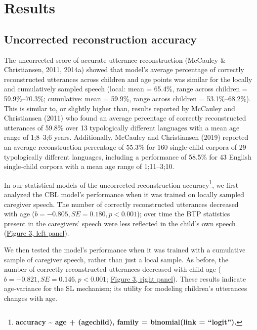 \documentclass[man,mask,floatsintext]{apa6}
\let\rmarkdownfootnote\footnote%
\def\footnote{\protect\rmarkdownfootnote}
\begin{document}
\section{Results}\label{results}

\subsection{Uncorrected reconstruction
accuracy}\label{uncorrected-reconstruction-accuracy}

The uncorrected score of accurate utterance reconstruction (McCauley \&
Christiansen, 2011, 2014a) showed that model's average percentage of
correctly reconstructed utterances across children and age points was
similar for the locally and cumulatively sampled speech (local: mean =
65.4\%, range across children = 59.9\%--70.3\%; cumulative: mean =
59.9\%, range across children = 53.1\%--68.2\%). This is similar to, or
slightly higher than, results reported by McCauley and Christiansen
(2011) who found an average percentage of correctly reconstructed
utterances of 59.8\% over 13 typologically different languages with a
mean age range of 1;8--3;6 years. Additionally, McCauley and
Christiansen (2019) reported an average reconstruction percentage of
55.3\% for 160 single-child corpora of 29 typologically different
languages, including a performance of 58.5\% for 43 English single-child
corpora with a mean age range of 1;11--3;10.

In our statistical models of the uncorrected reconstruction
accuracy\footnote{\textbf{accuracy \textasciitilde{} age +
  (age\textbar{}child), family = binomial(link = \enquote{logit}).}}, we
first analyzed the CBL model's performance when it was trained on
locally sampled caregiver speech. The number of correctly reconstructed
utterances decreased with age (\(b = -0.805, SE = 0.180, p < 0.001\));
over time the BTP statistics present in the caregivers' speech were less
reflected in the child's own speech (\protect\hyperlink{fig3}{Figure 3,
left panel}).

We then tested the model's performance when it was trained with a
cumulative sample of caregiver speech, rather than just a local sample.
As before, the number of correctly reconstructed utterances decreased
with child age (\(b=-0.821, SE = 0.146, p < 0.001\);
\protect\hyperlink{fig3}{Figure 3, right panel}). These results indicate
age-variance for the SL mechanism; its utility for modeling children's
utterances changes with age.
\end{document}

